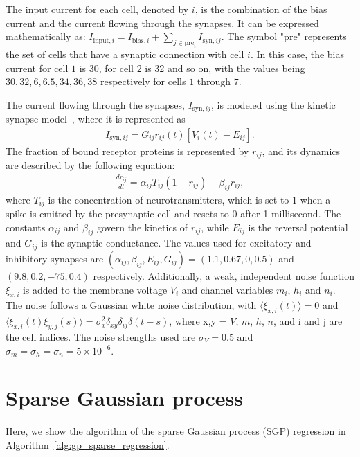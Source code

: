 The input current for each cell, denoted by $i$, is the combination of the bias current and the current flowing through the synapses. It can be expressed mathematically as: $I_{\mathrm{input},i} = I_{\mathrm{bias},i} + \sum_{j \in \mathrm{pre}_{i}} I_{\mathrm{syn},ij}$. The symbol "pre" represents the set of cells that have a synaptic connection with cell $i$. In this case, the bias current for cell $1$ is 30, for cell $2$ is 32 and so on, with the values being $30,32,6,6.5,34,36,38$ respectively for cells $1$ through $7$.

The current flowing through the synapses, $I_{\mathrm{syn},ij}$, is modeled using the kinetic synapse model~\cite{Destexhe1994}, where it is represented as
\begin{align}
    I_{\mathrm{syn},ij} = G_{ij}r_{ij}(t)[V_i(t) - E_{ij}].
\end{align}
The fraction of bound receptor proteins is represented by $r_{ij}$, and its dynamics are described by the following equation:
\begin{align}
    \frac{dr_{ij}}{dt} = \alpha_{ij}T_{ij}(1 - r_{ij}) - \beta_{ij}r_{ij},
\end{align}
where $T_{ij}$ is the concentration of neurotransmitters, which is set to 1 when a spike is emitted by the presynaptic cell and resets to 0 after 1 millisecond. The constants $\alpha_{ij}$ and $\beta_{ij}$ govern the kinetics of $r_{ij}$, while $E_{ij}$ is the reversal potential and $G_{ij}$ is the synaptic conductance. The values used for excitatory and inhibitory synapses are $(\alpha_{ij},\beta_{ij},E_{ij},G_{ij}) = (1.1, 0.67, 0, 0.5)$ and $(9.8, 0.2, -75, 0.4)$ respectively. Additionally, a weak, independent noise function $\xi_{x,i}$ is added to the membrane voltage $V_i$ and channel variables $m_i$, $h_i$ and $n_i$. The noise follows a Gaussian white noise distribution, with $\langle \xi_{x,i}(t) \rangle = 0$ and $\langle \xi_{x,i}(t)\xi_{y,j}(s) \rangle = \sigma_x^2 \delta_{xy}\delta_{ij}\delta(t - s)$, where x,y = $V$, $m$, $h$, $n$, and i and j are the cell indices. The noise strengths used are $\sigma_V = 0.5$ and $\sigma_m = \sigma_h = \sigma_n = 5 \times 10^{-6}$.

\section{Sparse Gaussian process}
\label{sec:sparse-gp}
Here, we show the algorithm of the sparse Gaussian process (SGP) regression in Algorithm~\ref{alg:gp_sparse_regression}.

